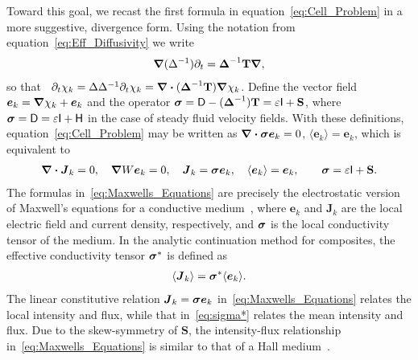 \documentclass[leqno,onefignum,onetabnum]{siamltex1213}
\newcommand{\Tb}{\mathbf{T}}
\newcommand{\Sb}{\mathbf{S}}
\newcommand{\Dm}{\mathsf{D}}
\newcommand{\Hm}{\mathsf{H}}
\newcommand{\Ib}{\mathsf{I}}
\newcommand\bsig{\mbox{\boldmath${\sigma}$}}
\newcommand\bDelta{\mbox{\boldmath${\Delta}$}}
\newcommand\bnabla{\mbox{\boldmath${\nabla}$}}
\providecommand\bcdot{\boldsymbol{\cdot}}
\newcommand{\vecJ}{\boldsymbol{J}}
\newcommand{\vece}{\boldsymbol{e}}
\begin{document}
Toward this goal, we recast the first formula in
equation~\eqref{eq:Cell_Problem} in a more suggestive, divergence
form. Using 
the notation from equation~\eqref{eq:Eff_Diffusivity} we write 
%
\begin{align}%
  \bnabla (\Delta^{-1})\partial_t=\bDelta^{-1}\Tb\bnabla ,
\end{align}
%
so that~\cite{Fannjiang:1994:SIAM_JAM:333}
$\partial_t\chi_k=\Delta\Delta^{-1}\partial_t\chi_k=\bnabla \bcdot(\bDelta^{-1}\Tb)\bnabla \chi_k$. Define the  
vector field $\vece _k=\bnabla \chi_k+\vece _k$ and the operator
$\bsig=\Dm-(\bDelta^{-1})\Tb=\varepsilon\Ib+\Sb$, where
$\bsig=\Dm=\varepsilon\Ib+\Hm$ in the case of steady fluid velocity
fields. With these definitions, equation~\eqref{eq:Cell_Problem} may
be written as  $\bnabla \bcdot\bsig\vece _k=0$, $\langle\vece _k\rangle=\vece _k$,
which is equivalent to    
%
\begin{align}\label{eq:Maxwells_Equations}    
  \bnabla \bcdot\vecJ_k=0, \quad
  \bnabla W\vece _k=0, \quad
  \vecJ_k=\bsig\vece _k,\quad
  \langle\vece _k\rangle=\vece _k,\qquad
  \bsig%
       =\varepsilon\Ib+\Sb.
\end{align}
%
The formulas in~\eqref{eq:Maxwells_Equations} are precisely the
electrostatic version of Maxwell's equations for a conductive
medium~\cite{Golden:CMP-473}, where $\vece _k$ and $\vecJ_k$ are the
local 
electric field and current density, respectively, and $\bsig$ is the
local conductivity tensor of the medium. In the analytic continuation method for composites,
the effective conductivity tensor $\bsig^*$ is defined as
% 
\begin{align}\label{eq:sigma*}
  \langle\vecJ_k\rangle=\bsig^*\langle\vece _k\rangle.
\end{align}
%
The linear constitutive relation $\vecJ_k=\bsig\vece _k$
in~\eqref{eq:Maxwells_Equations} relates the local intensity and flux, 
while that in~\eqref{eq:sigma*} relates the mean intensity and
flux. Due to the skew-symmetry of $\Sb$, the intensity-flux
relationship in~\eqref{eq:Maxwells_Equations} is similar to that of a
Hall medium~\cite{Isichenko:JNS:1991:375}.
\end{document}
